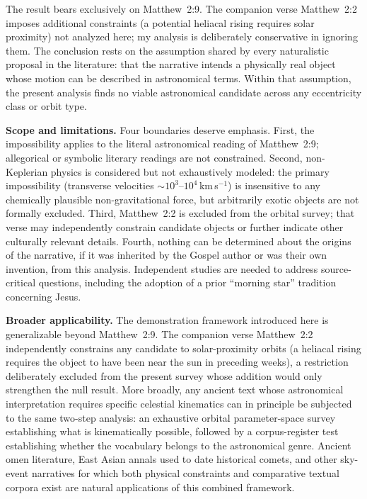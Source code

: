 \documentclass[sn-nature]{sn-jnl}
\begin{document}
The result bears exclusively on Matthew~2:9. The companion verse Matthew~2:2
imposes additional constraints (a potential heliacal rising requires solar
proximity) not analyzed here; my analysis is
deliberately conservative in ignoring them. The conclusion rests on the
assumption shared by every naturalistic proposal in the literature: that the
narrative intends a physically real object whose motion can be described in
astronomical terms. Within that assumption, the present analysis finds no
viable astronomical candidate across any eccentricity class or orbit type.

\textbf{Scope and limitations.}
Four boundaries deserve emphasis. First, the impossibility applies to the
literal astronomical reading of Matthew~2:9; allegorical or symbolic
literary readings are not constrained. Second, non-Keplerian physics is
considered but not exhaustively modeled: the primary impossibility (transverse
velocities $\sim\!10^3$--$10^4$\,km\,s$^{-1}$) is insensitive to any
chemically plausible non-gravitational force, but arbitrarily exotic objects
are not formally excluded. Third, Matthew~2:2 is excluded from the orbital
survey; that verse may independently constrain candidate objects or further indicate 
other culturally relevant details. Fourth, nothing can be determined 
about the origins of the narrative, if it was inherited by the Gospel author or was their 
own invention, from this analysis. Independent studies are needed to address source-critical 
questions, including the adoption of a prior ``morning star'' tradition concerning Jesus\cite{adair_jsnt}.

\textbf{Broader applicability.}
The demonstration framework introduced here is generalizable beyond Matthew~2:9.
The companion verse Matthew~2:2 independently constrains any candidate to
solar-proximity orbits (a heliacal rising requires the object to have been near
the sun in preceding weeks), a restriction deliberately excluded from the
present survey whose addition would only strengthen the null result.
More broadly, any ancient text whose astronomical interpretation requires
specific celestial kinematics can in principle be subjected to the same
two-step analysis: an exhaustive orbital parameter-space survey establishing
what is kinematically possible, followed by a corpus-register test establishing
whether the vocabulary belongs to the astronomical genre.
Ancient omen literature, East Asian annals used to date historical comets,
and other sky-event narratives for which both physical constraints and
comparative textual corpora exist are natural applications of this combined framework.
\end{document}
